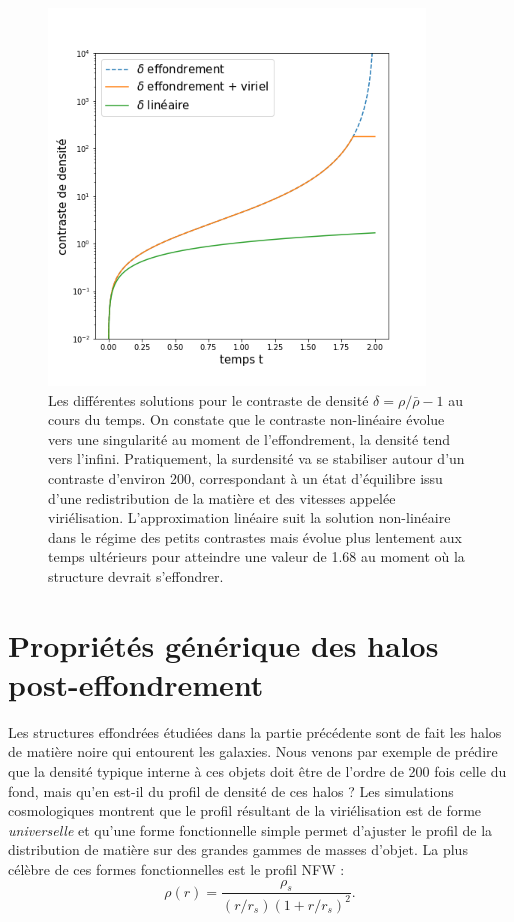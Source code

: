 \begin{figure}[htbp]
	\centering
		\includegraphics[height=10cm]{figs/delta_coll.png}
		\caption[Evolution temporelle du contraste de densité pour l'effondrement sphérique]{Les différentes solutions pour le contraste de densité $\delta=\rho/\bar \rho -1$ au cours du temps. On constate que le contraste non-linéaire évolue vers une singularité au moment de l'effondrement, la densité tend vers l'infini. Pratiquement, la surdensité va se stabiliser autour d'un contraste d'environ 200, correspondant à un état d'équilibre issu d'une redistribution de la matière et des vitesses appelée viriélisation. L'approximation linéaire suit la solution non-linéaire dans le régime des petits contrastes mais évolue plus lentement aux temps ultérieurs pour atteindre une valeur de 1.68 au moment où la structure devrait s'effondrer.}
	\label{f:dcoll}
\end{figure}


\section{Propriétés générique des halos post-effondrement}
Les structures effondrées étudiées dans la partie précédente sont de fait les halos de matière noire qui entourent les galaxies. Nous venons par exemple de prédire que la densité typique interne à ces objets doit être de l'ordre de 200 fois celle du fond, mais qu'en est-il du profil de densité de ces halos ? Les simulations cosmologiques montrent que le profil résultant de la viriélisation est de forme \textit{ universelle} et qu'une forme fonctionnelle simple permet d'ajuster le profil de la distribution de matière sur des grandes gammes de masses d'objet. La plus célèbre de ces formes fonctionnelles est le profil NFW  : 
\begin{equation}
\rho(r)=\frac{\rho_s}{(r/r_s)(1+r/r_s)^2}.
\end{equation}

